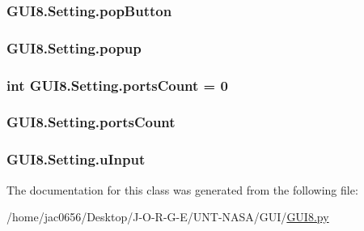 \subsubsection[{\texorpdfstring{pop\+Button}{popButton}}]{\setlength{\rightskip}{0pt plus 5cm}G\+U\+I8.\+Setting.\+pop\+Button}\hypertarget{classGUI8_1_1Setting_acc73ea40eec7a5df29c126a05ea50469}{}\label{classGUI8_1_1Setting_acc73ea40eec7a5df29c126a05ea50469}
\subsubsection[{\texorpdfstring{popup}{popup}}]{\setlength{\rightskip}{0pt plus 5cm}G\+U\+I8.\+Setting.\+popup}\hypertarget{classGUI8_1_1Setting_af92ec45f76ce50d80dd6c79212a7a4c0}{}\label{classGUI8_1_1Setting_af92ec45f76ce50d80dd6c79212a7a4c0}
\subsubsection[{\texorpdfstring{ports\+Count}{portsCount}}]{\setlength{\rightskip}{0pt plus 5cm}int G\+U\+I8.\+Setting.\+ports\+Count = 0\hspace{0.3cm}{\ttfamily [static]}}\hypertarget{classGUI8_1_1Setting_a44d535d99519430baf5e908b6112911f}{}\label{classGUI8_1_1Setting_a44d535d99519430baf5e908b6112911f}
\subsubsection[{\texorpdfstring{ports\+Count}{portsCount}}]{\setlength{\rightskip}{0pt plus 5cm}G\+U\+I8.\+Setting.\+ports\+Count}\hypertarget{classGUI8_1_1Setting_a4852358f903995dedbb40d738957f40e}{}\label{classGUI8_1_1Setting_a4852358f903995dedbb40d738957f40e}
\subsubsection[{\texorpdfstring{u\+Input}{uInput}}]{\setlength{\rightskip}{0pt plus 5cm}G\+U\+I8.\+Setting.\+u\+Input}\hypertarget{classGUI8_1_1Setting_aaae8736d5ba95fca6d8e95d44cb1370c}{}\label{classGUI8_1_1Setting_aaae8736d5ba95fca6d8e95d44cb1370c}


The documentation for this class was generated from the following file\+:\begin{DoxyCompactItemize}
\item 
/home/jac0656/\+Desktop/\+J-\/\+O-\/\+R-\/\+G-\/\+E/\+U\+N\+T-\/\+N\+A\+S\+A/\+G\+U\+I/\hyperlink{GUI_2GUI8_8py}{G\+U\+I8.\+py}\end{DoxyCompactItemize}
